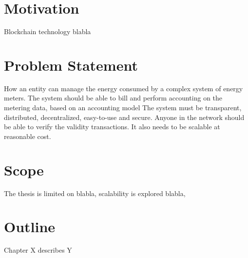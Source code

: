 \section{Motivation}
Blockchain technology blabla

\section{Problem Statement}
How an entity can manage the energy consumed by a complex system of energy meters.
The  system should be able to bill and perform accounting on the metering data, based on an accounting model
The system must be transparent, distributed, decentralized, easy-to-use and secure.
Anyone in the network should be able to verify the validity transactions.
It also needs to be scalable at reasonable cost.

\section{Scope}
The thesis is limited on blabla, scalability is explored blabla, 

\section{Outline}
Chapter X describes Y